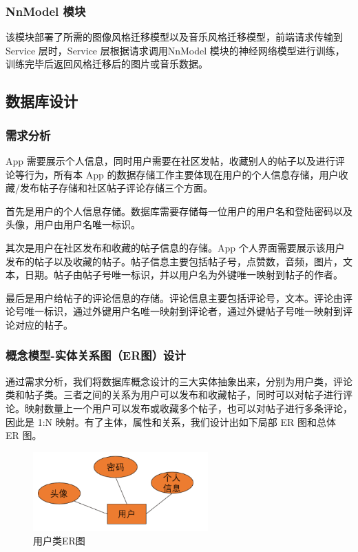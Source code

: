 \subsubsection{NnModel 模块}

该模块部署了所需的图像风格迁移模型以及音乐风格迁移模型，前端请求传输到 Service 层时，Service 层根据请求调用NnModel 模块的神经网络模型进行训练，训练完毕后返回风格迁移后的图片或音乐数据。

\subsection{数据库设计}

\subsubsection{需求分析}

App 需要展示个人信息，同时用户需要在社区发帖，收藏别人的帖子以及进行评论等行为，所有本 App 的数据存储工作主要体现在用户的个人信息存储，用户收藏/发布帖子存储和社区帖子评论存储三个方面。

首先是用户的个人信息存储。数据库需要存储每一位用户的用户名和登陆密码以及头像，用户由用户名唯一标识。

其次是用户在社区发布和收藏的帖子信息的存储。App 个人界面需要展示该用户发布的帖子以及收藏的帖子。帖子信息主要包括帖子号，点赞数，音频，图片，文本，日期。帖子由帖子号唯一标识，并以用户名为外键唯一映射到帖子的作者。

最后是用户给帖子的评论信息的存储。评论信息主要包括评论号，文本。评论由评论号唯一标识，通过外键用户名唯一映射到评论者，通过外键帖子号唯一映射到评论对应的帖子。

\subsubsection{概念模型-实体关系图（ER图）设计}

通过需求分析，我们将数据库概念设计的三大实体抽象出来，分别为用户类，评论类和帖子类。三者之间的关系为用户可以发布和收藏帖子，同时可以对帖子进行评论。映射数量上一个用户可以发布或收藏多个帖子，也可以对帖子进行多条评论，因此是 1:N 映射。有了主体，属性和关系，我们设计出如下局部 ER 图和总体 ER 图。

\begin{figure}[H]
    \centering
    \includegraphics[width=0.6\textwidth]{figures/ER1.png}
    \caption{用户类ER图}
    \label{fig:my_label}
\end{figure}

